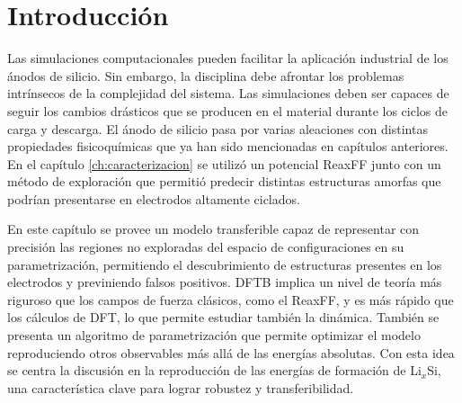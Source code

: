 \section{Introducción}

Las simulaciones computacionales pueden facilitar la aplicación industrial de los
ánodos de silicio. Sin embargo, la disciplina debe afrontar los problemas 
intrínsecos de la complejidad del sistema. Las simulaciones deben ser capaces
de seguir los cambios drásticos que se producen en el material durante los ciclos
de carga y descarga. El ánodo de silicio pasa por varias aleaciones con distintas
propiedades fisicoquímicas que ya han sido mencionadas en capítulos anteriores.
En el capítulo \ref{ch:caracterizacion} se utilizó un potencial ReaxFF 
\cite{fan2013} junto con un método de exploración que permitió predecir distintas
estructuras amorfas que podrían presentarse en electrodos altamente ciclados.

En este capítulo se provee un modelo transferible capaz de representar con 
precisión las regiones no exploradas del espacio de configuraciones en su 
parametrización, permitiendo el descubrimiento de estructuras presentes en los
electrodos y previniendo falsos positivos. DFTB implica un nivel de teoría
más riguroso que los campos de fuerza clásicos, como el ReaxFF, y es más rápido que
los cálculos de DFT, lo que permite 
estudiar también la dinámica. También se presenta un algoritmo de parametrización
que permite optimizar el modelo reproduciendo otros observables más allá de las
energías absolutas. Con esta idea se centra la discusión en la reproducción de las
energías de formación de Li$_x$Si, una característica clave para lograr robustez
y transferibilidad. 
